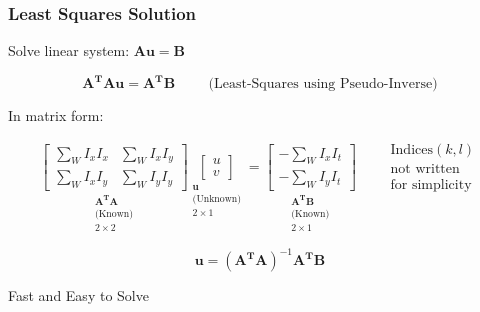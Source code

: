 \begin{frame}
  \frametitle{Least Squares Solution}

  Solve linear system: \quad $\mathbf{A u = B}$

  \begin{equation*}
  \mathbf{A^T A u = A^T B} \hspace{1cm} \text{(Least-Squares using Pseudo-Inverse)}
  \end{equation*}

  In matrix form:

  \begin{equation*}
  \underset{\substack{\mathbf{A^T A} \\ \text{(Known)} \\2\times2}}{
    \boxed{
    \begin{bmatrix}
    \sum_W I_x I_x & \sum_W I_x I_y \\
    \sum_W I_x I_y & \sum_W I_y I_y
    \end{bmatrix}
    }
  }
  \underset{\substack{\mathbf{u} \\ \text{(Unknown)}\\ 2\times1}}{
    \boxed{
      \begin{bmatrix}
      u \\ v
      \end{bmatrix}
    }
  }
  =
  \underset{\substack{\mathbf{A^T B} \\\text{(Known)} \\ 2\times1}}{
    \boxed{
      \begin{bmatrix}
      -\sum_W I_x I_t \\ -\sum_W I_y I_t
      \end{bmatrix}
    }
  }
  \qquad \substack{\text{Indices} (k,l)\\ \text{not written}\\ \text{for simplicity}}
  \end{equation*}

  \begin{equation*}
  \boxed{\mathbf{u} = (\mathbf{A^T A})^{-1}\mathbf{A^T B}}
  \end{equation*}

  Fast and Easy to Solve

\end{frame}

